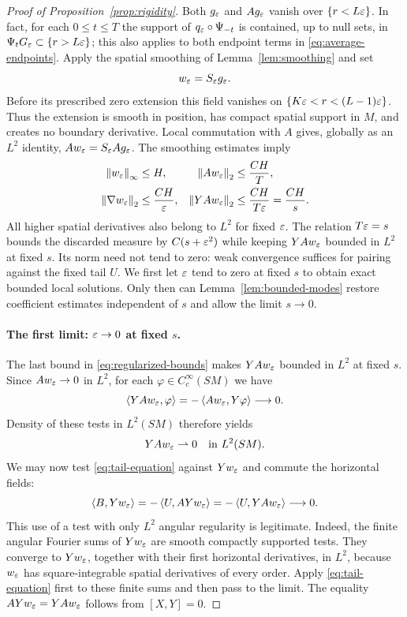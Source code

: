 \begin{proof}[Proof of Proposition~\ref{prop:rigidity}]
Both $g_\varepsilon$ and $Ag_\varepsilon$ vanish over $\{r<L\varepsilon\}$.  In fact, for
each $0\le t\le T$ the support of
$q_\varepsilon\circ\Psi_{-t}$ is contained, up to null sets, in
$\Psi_tG_\varepsilon\subset\{r>L\varepsilon\}$; this also applies to both endpoint
terms in \eqref{eq:average-endpoints}.
Apply the spatial smoothing of Lemma~\ref{lem:smoothing} and set
\[
 w_\varepsilon=S_\varepsilon g_\varepsilon.
\]
Before its prescribed zero extension this field vanishes on
$\{K\varepsilon<r<(L-1)\varepsilon\}$.  Thus the extension is smooth in position,
has compact spatial support in $M$, and creates no boundary derivative.
Local commutation with $A$ gives, globally as an $L^2$ identity,
$Aw_\varepsilon=S_\varepsilon Ag_\varepsilon$.  The smoothing estimates imply
\begin{equation}\label{eq:regularized-bounds}
 \begin{aligned}
 \left\lVert w_\varepsilon\right\rVert_\infty&\le H,
 &\left\lVert Aw_\varepsilon\right\rVert_2&\le\frac{CH}{T},\\
 \left\lVert\nabla w_\varepsilon\right\rVert_2&\le\frac{CH}{\varepsilon},
 &\left\lVert YAw_\varepsilon\right\rVert_2&\le\frac{CH}{T\varepsilon}=\frac{CH}{s}.
 \end{aligned}
\end{equation}
All higher spatial derivatives also belong to $L^2$ for fixed $\varepsilon$.
The relation $T\varepsilon=s$ bounds the discarded measure by $C(s+\varepsilon^2)$
while keeping $YAw_\varepsilon$ bounded in $L^2$ at fixed $s$. Its norm need
not tend to zero: weak convergence suffices for pairing against the fixed
tail $U$. We first let $\varepsilon$ tend to zero at fixed $s$ to obtain exact
bounded local solutions. Only then can Lemma~\ref{lem:bounded-modes}
restore coefficient estimates independent of $s$ and allow the limit
$s\to0$.

\paragraph{The first limit: $\varepsilon\to0$ at fixed $s$.}
The last bound in \eqref{eq:regularized-bounds} makes $YAw_\varepsilon$ bounded
in $L^2$ at fixed $s$.  Since $Aw_\varepsilon\to0$ in $L^2$, for each
$\varphi\in C_c^\infty(SM)$ we have
\[
 \left\langle YAw_\varepsilon,\varphi\right\rangle
 =-\left\langle Aw_\varepsilon,Y\varphi\right\rangle\longrightarrow0.
\]
Density of these tests in $L^2(SM)$ therefore yields
\begin{equation}\label{eq:weak-error}
 YAw_\varepsilon\rightharpoonup0\quad\text{in }L^2(SM).
\end{equation}
We may now test \eqref{eq:tail-equation} against $Yw_\varepsilon$ and commute
the horizontal fields:
\begin{equation}\label{eq:tail-pairing}
 \left\langle B,Yw_\varepsilon\right\rangle
 =-\left\langle U,AYw_\varepsilon\right\rangle
 =-\left\langle U,YAw_\varepsilon\right\rangle\longrightarrow0.
\end{equation}
This use of a test with only $L^2$ angular regularity is legitimate.
Indeed, the finite angular Fourier sums of $Yw_\varepsilon$ are smooth compactly
supported tests.  They converge to $Yw_\varepsilon$, together with their first
horizontal derivatives, in $L^2$, because $w_\varepsilon$ has square-integrable
spatial derivatives of every order.  Apply
\eqref{eq:tail-equation} first to these finite sums and then pass to the
limit.  The equality $AYw_\varepsilon=YAw_\varepsilon$ follows from $[X,Y]=0$.


\end{proof}
